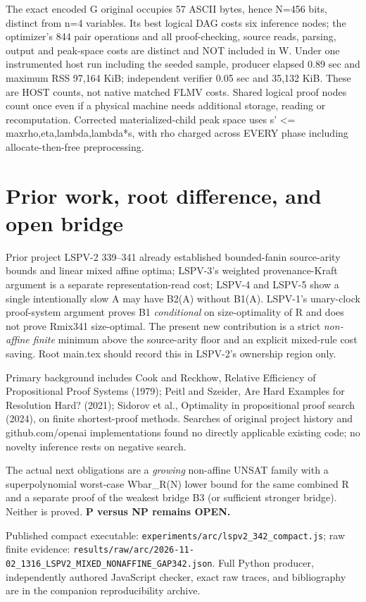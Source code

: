 \documentclass[11pt]{article}
\begin{document}
The exact encoded G original occupies 57 ASCII bytes, hence N=456 bits, distinct from n=4 variables. Its best logical DAG costs six inference nodes; the optimizer's 844 pair operations and all proof-checking, source reads, parsing, output and peak-space costs are distinct and NOT included in W. Under one instrumented host run including the seeded sample, producer elapsed 0.89 sec and maximum RSS 97,164 KiB; independent verifier 0.05 sec and 35,132 KiB. These are HOST counts, not native matched FLMV costs. Shared logical proof nodes count once even if a physical machine needs additional storage, reading or recomputation. Corrected materialized-child peak space uses s' <= max{rho,eta,lambda,lambda*s}, with rho charged across EVERY phase including allocate-then-free preprocessing.

\section{Prior work, root difference, and open bridge}
Prior project LSPV-2 339--341 already established bounded-fanin source-arity bounds and linear mixed affine optima; LSPV-3's weighted provenance-Kraft argument is a separate representation-read cost; LSPV-4 and LSPV-5 show a single intentionally slow A may have B2(A) without B1(A). LSPV-1's unary-clock proof-system argument proves B1 \emph{conditional} on size-optimality of R and does not prove Rmix341 size-optimal. The present new contribution is a strict \emph{non-affine finite} minimum above the source-arity floor and an explicit mixed-rule cost saving. Root main.tex should record this in LSPV-2's ownership region only.

Primary background includes Cook and Reckhow, Relative Efficiency of Propositional Proof Systems (1979); Peitl and Szeider, Are Hard Examples for Resolution Hard? (2021); Sidorov et al., Optimality in propositional proof search (2024), on finite shortest-proof methods. Searches of original project history and github.com/openai implementations found no directly applicable existing code; no novelty inference rests on negative search.

The actual next obligations are a \emph{growing} non-affine UNSAT family with a superpolynomial worst-case Wbar_R(N) lower bound for the same combined R and a separate proof of the weakest bridge B3 (or sufficient stronger bridge). Neither is proved. \textbf{P versus NP remains OPEN.}

\noindent Published compact executable: \texttt{experiments/arc/lspv2\_342\_compact.js}; raw finite evidence: \texttt{results/raw/arc/2026-11-02\_1316\_LSPV2\_MIXED\_NONAFFINE\_GAP342.json}. Full Python producer, independently authored JavaScript checker, exact raw traces, and bibliography are in the companion reproducibility archive.
\end{document}
